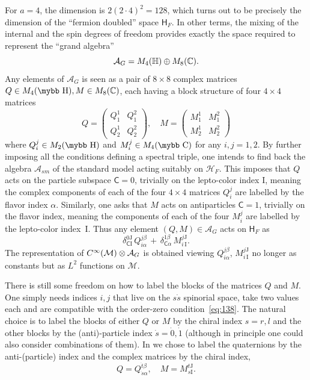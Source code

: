 \documentclass[11pt]{article}
\newcommand{\cinf}{{C^\infty({\cal M})}}
\newcommand{\M}{\mathcal M}
\newcommand{\A}{\mathcal A}
\def\bb#1{\hbox{\mybb#1}}
\newcommand{\sI}{\mathrm  I}
\newcommand{\sJ}{\mathrm J}
\newcommand{\sC}{\mathsf C}
\begin{document}
For $a=4$,
the dimension is $2(2\cdot 4)^2= 128$, which turns out to be precisely
the dimension of the ``fermion doubled'' space $\mathsf H_F$. In other
terms, the mixing of the internal and the spin degrees of freedom provides
exactly the space required to represent the ``grand  algebra''
\begin{equation}
{\cal A}_G=M_4({\mathbb H})\oplus M_8({\mathbb C}).
\end{equation}
Any elements of $\A_G$
is seen as a pair of $8\times 8$ complex matrices $Q\in M_4(\bb H), M\in
 M_8(\mathbb C)$, each having a block
structure of four  $4\times 4$ matrices
\begin{equation}
    \label{eq:16-01}
  Q
= \left(
\begin{array}{cc}
Q_{1}^{1} & Q_{1}^{2}\\
Q_{2}^{1} &Q_{2}^{2}
\end{array}\right) , \quad   M
= \left(
\begin{array}{cc}
 M^{1}_{1} &  M^{2}_{1}\\
M^{1}_{2} & M^{2}_{2}
\end{array}\right)
  \end{equation}
where $Q_i^j\in M_2(\bb H)$ and $M_i^j\in M_4(\bb C)$ for any $i,j
=1,2$. By further imposing all the conditions defining a
spectral triple, one intends to find back the algebra $\A_{sm}$ of the
standard model acting suitably on $\mathcal H_F$. This imposes that
$Q$ acts on the particle subspace $\sC=0$,
 trivially on the
lepto-color index $\sI$, meaning the
complex components of each of the four $4\times 4$ matrices $Q_i^j$ are labelled by
the flavor index $\alpha$. Similarly, one asks that $M$ acts on
antiparticles $\sC=1$, trivially on the flavor
index, meaning the components of each of the four $M_i^j$ are labelled
by the  lepto-color index~$\sI$.  
Thus any element $(Q, M)\in\A_G$ acts on
$\mathsf H_F$ as
\begin{equation}
  \label{eq:139}
\delta_{\mathsf C\sI}^{0\sJ}\,Q_{i \alpha}^{j\beta} \, +\,
\delta_{\mathsf C\alpha}^{1\beta}\, M_{i\,\sI}^{j\sJ}.
\end{equation}
The representation of $\cinf\otimes\A_G$ is obtained
viewing $Q_{i \alpha}^{j\beta}$, $M_{i\,\sI}^{j\sJ}$ no longer as constants but as $L^2$
functions on $\M$. 

There is still some freedom on how  to label the blocks of
the matrices $Q$ and $M$. One simply needs indices $i,j$  that
live on the $s\dot s$ spinorial space, take two
values each and are compatible
with the order-zero condition~\eqref{eq:138}. The natural choice is to
label the blocks of either $Q$ or $M$ by the chiral index
$s=r,l$ and the other blocks by the (anti)-particle index $\dot s= \dot 0, \dot
1$ (although in principle one could also consider combinations
of them). In \cite{Devastato:2013fk} we chose to label the quaternions by the
anti-(particle) index and the complex matrices by the chiral
index,
\begin{equation}
  \label{eq:49bis}
  Q= Q_{\dot s \alpha}^{\dot t\beta}, \quad M = M_{s\sI}^{t\sJ}.
\end{equation}
\end{document}
